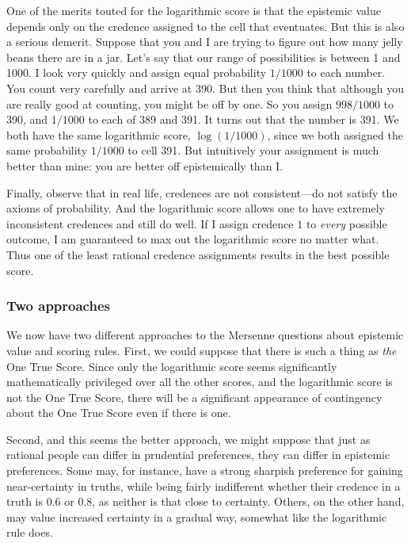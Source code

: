 One of the merits touted for the logarithmic score is that the epistemic value depends only on the credence assigned 
to the cell that eventuates.  But this is also
a serious demerit. Suppose that you and I are trying to figure out how many jelly beans there are in a jar. Let's say that our range of
possibilities is between 1 and 1000. I look very quickly and assign equal probability $1/1000$ to each number. You count very carefully
and arrive at 390. But then you think that although you are really good at counting, you might be off by one. So you assign $998/1000$
to 390, and $1/1000$ to each of 389 and 391. It turns out that the number is 391. We both have the same logarithmic score, $\log (1/1000)$,
since we both assigned the same probability $1/1000$ to cell 391. But intuitively your assignment is much better than mine: you are better
off epistemically than I.

Finally, observe that in real life, credences are not consistent---do not satisfy the axioms of probability. And the logarithmic score
allows one to have extremely inconsistent credences and still do well. If I assign credence $1$ to \textit{every} possible outcome, I am
guaranteed to max out the logarithmic score no matter what. Thus one of the least rational credence assignments results in the best
possible score.

\subsubsection{Two approaches}\label{sec:pathological}
We now have two different approaches to the Mersenne questions about epistemic value and scoring rules. First, we could suppose that there
is such a thing as \textit{the} One True Score. Since only the logarithmic score seems significantly mathematically privileged over all
the other scores, and the logarithmic score is not the One True Score, there will be a significant appearance of contingency about the
One True Score even if there is one.

Second, and this seems the better approach, we might suppose that just as rational people can differ in prudential preferences, they can differ in epistemic preferences. 
Some may, for instance, have a strong sharpish preference for gaining near-certainty in truths, while being fairly indifferent whether their
credence in a truth is $0.6$ or $0.8$, as neither is that close to certainty. Others, on the other hand, may value increased certainty in
a gradual way, somewhat like the logarithmic rule does. 

